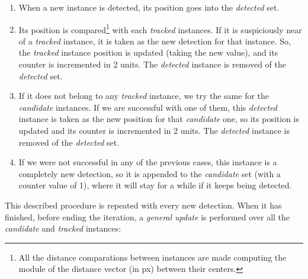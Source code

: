 	\begin{enumerate}
		\item When a new instance is detected, its position goes into the \emph{detected} set.
		
		\item Its position is compared\footnote{All the distance comparations between instances are made computing the module of the distance vector (in px) between their centers.} with each \emph{tracked} instances. If it is suspiciously near of a \emph{tracked} instance, it is taken as the new detection for that instance. So, the \emph{tracked} instance position is updated (taking the new value), and its counter is incremented in 2 units. The \emph{detected} instance is removed of the \emph{detected} set.
		
		\item If it does not belong to any \emph{tracked} instance, we try the same for the \emph{candidate} instances. If we are successful with one of them, this \emph{detected} instance is taken as the new position for that \emph{candidate} one, so its position is updated and its counter is incremented in 2 units. The \emph{detected} instance is removed of the \emph{detected} set.
		
		\item If we were not successful in any of the previous cases, this instance is a completely new detection, so it is appended to the \emph{candidate} set (with a counter value of 1), where it will stay for a while if it keeps being detected.
	\end{enumerate}

	This described procedure is repeated with every new detection. When it has finished, before ending the iteration, a \emph{general update} is performed over all the \emph{candidate} and \emph{tracked} instances:
	
